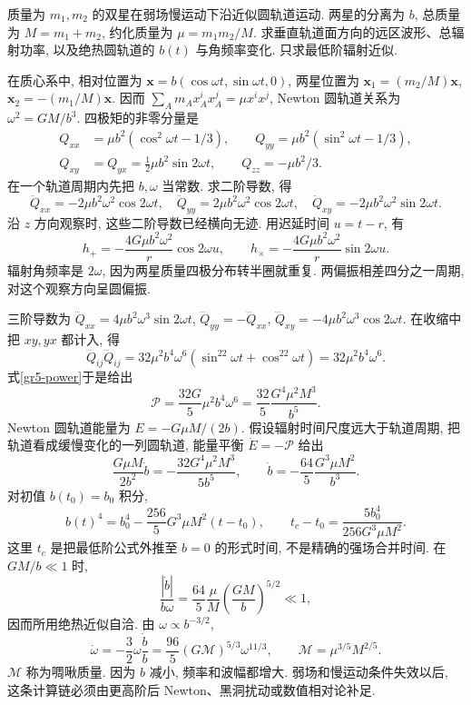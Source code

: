 \begin{example}
质量为 $m_1,m_2$ 的双星在弱场慢运动下沿近似圆轨道运动. 两星的分离为 $b$, 总质量为 $M=m_1+m_2$, 约化质量为 $\mu=m_1m_2/M$. 求垂直轨道面方向的远区波形、总辐射功率, 以及绝热圆轨道的 $b(t)$ 与角频率变化. 只求最低阶辐射近似.
\end{example}
\begin{solution}
在质心系中, 相对位置为 $\boldsymbol x=b(\cos\omega t,\sin\omega t,0)$, 两星位置为 $\boldsymbol x_1=(m_2/M)\boldsymbol x$, $\boldsymbol x_2=-(m_1/M)\boldsymbol x$. 因而 $\sum_A m_Ax_A^ix_A^j=\mu x^ix^j$, Newton 圆轨道关系为 $\omega^2=GM/b^3$. 四极矩的非零分量是
\begin{align*}
 Q_{xx}&=\mu b^2(\cos^2\omega t-1/3),\qquad
 Q_{yy}=\mu b^2(\sin^2\omega t-1/3),\\
 Q_{xy}&=Q_{yx}=\frac12\mu b^2\sin2\omega t,\qquad Q_{zz}=-\mu b^2/3.
\end{align*}
在一个轨道周期内先把 $b,\omega$ 当常数. 求二阶导数, 得
\[
 \ddot Q_{xx}=-2\mu b^2\omega^2\cos2\omega t,
 \quad \ddot Q_{yy}=2\mu b^2\omega^2\cos2\omega t,
 \quad \ddot Q_{xy}=-2\mu b^2\omega^2\sin2\omega t.
\]
沿 $z$ 方向观察时, 这些二阶导数已经横向无迹. 用迟延时间 $u=t-r$, 有
\[
 h_+=-\frac{4G\mu b^2\omega^2}{r}\cos2\omega u,
 \qquad h_\times=-\frac{4G\mu b^2\omega^2}{r}\sin2\omega u.
\]
辐射角频率是 $2\omega$, 因为两星质量四极分布转半圈就重复. 两偏振相差四分之一周期, 对这个观察方向呈圆偏振.

三阶导数为 $\dddot Q_{xx}=4\mu b^2\omega^3\sin2\omega t$, $\dddot Q_{yy}=-\dddot Q_{xx}$, $\dddot Q_{xy}=-4\mu b^2\omega^3\cos2\omega t$. 在收缩中把 $xy,yx$ 都计入, 得
\[
 \dddot Q_{ij}\dddot Q_{ij}
 =32\mu^2b^4\omega^6(\sin^22\omega t+\cos^22\omega t)
 =32\mu^2b^4\omega^6.
\]
式\eqref{gr5-power}于是给出
\begin{equation}\label{gr5-binary-power}
 \mathcal P=\frac{32G}{5}\mu^2b^4\omega^6
            =\frac{32}{5}\frac{G^4\mu^2M^3}{b^5}.
\end{equation}
Newton 圆轨道能量为 $E=-G\mu M/(2b)$. 假设辐射时间尺度远大于轨道周期, 把轨道看成缓慢变化的一列圆轨道, 能量平衡 $\dot E=-\mathcal P$ 给出
\[
 \frac{G\mu M}{2b^2}\dot b=-\frac{32G^4\mu^2M^3}{5b^5},
 \qquad \dot b=-\frac{64}{5}\frac{G^3\mu M^2}{b^3}.
\]
对初值 $b(t_0)=b_0$ 积分,
\[
 b(t)^4=b_0^4-\frac{256}{5}G^3\mu M^2(t-t_0),
 \qquad t_c-t_0=\frac{5b_0^4}{256G^3\mu M^2}.
\]
这里 $t_c$ 是把最低阶公式外推至 $b=0$ 的形式时间, 不是精确的强场合并时间. 在 $GM/b\ll1$ 时,
\[
 \frac{|\dot b|}{b\omega}=
 \frac{64}{5}\frac\mu M\left(\frac{GM}{b}\right)^{5/2}\ll1,
\]
因而所用绝热近似自洽. 由 $\omega\propto b^{-3/2}$,
\[
 \dot\omega=-\frac32\omega\frac{\dot b}{b}
 =\frac{96}{5}(G\mathcal M)^{5/3}\omega^{11/3},
 \qquad \mathcal M=\mu^{3/5}M^{2/5}.
\]
$\mathcal M$ 称为啁啾质量. 因为 $b$ 减小, 频率和波幅都增大. 弱场和慢运动条件失效以后, 这条计算链必须由更高阶后 Newton、黑洞扰动或数值相对论补足.
\end{solution}
